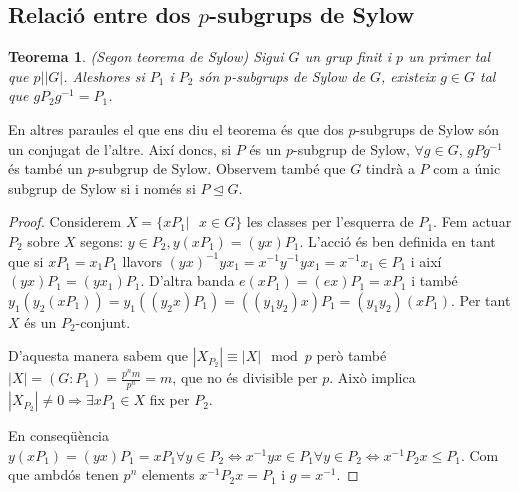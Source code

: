 \documentclass[a4paper,11pt]{report}
\newcommand{\inv}[1]{#1^{-1}}
\newcommand{\ordre}[1]{|#1|}
\theoremstyle{theorem}
\newtheorem{teorema}{\normalfont \sffamily\bfseries Teorema}[section]
\theoremstyle{definition}
\begin{document}
\subsection{Relació entre dos $p$-subgrups de Sylow}
\begin{teorema}{(Segon teorema de Sylow)}
Sigui $G$ un grup finit i $p$ un primer tal que $p\big| |G|$. Aleshores si $P_1$ i $P_2$ són $p$-subgrups de Sylow de $G$, existeix $g\in G$ tal que $gP_2\inv{g}=P_1$. 
\end{teorema}
En altres paraules el que ens diu el teorema és que dos $p$-subgrups de Sylow són un conjugat de l'altre. Així doncs, si $P$ és un $p$-subgrup de Sylow, $\forall g\in G$, $gP\inv{g}$ és també un $p$-subgrup de Sylow. Observem també que $G$ tindrà a $P$ com a únic subgrup de Sylow si i només si $P\unlhd G$.
\begin{proof}
	Considerem $X=\{xP_1|\text{ }x\in G\}$ les classes per l'esquerra de $P_1$. Fem actuar $P_2$ sobre $X$ segons: $y\in P_2, y(xP_1)=(yx)P_1$.
	L'acció és ben definida en tant que si $xP_1=x_1P_1$ llavors $\inv{(yx)}yx_1=\inv{x}\inv{y}yx_1=\inv{x}x_1\in P_1$ i així $(yx)P_1=(yx_1)P_1$. D'altra banda $e(xP_1)=(ex)P_1=xP_1$ i també $y_1(y_2(xP_1))=y_1((y_2x)P_1)=((y_1y_2)x)P_1=(y_1y_2)(xP_1)$. Per tant $X$ és un $P_2$-conjunt.
	
	D'aquesta manera sabem que $\ordre{X_{P_2}}\equiv\ordre{X}\mod p$ però també $\ordre{X}=(G:P_1)=\tfrac{p^nm}{p^n}=m$, que no és divisible per $p$. Això implica $\ordre{X_{P_2}}\neq 0\Rightarrow \exists xP_1\in X$ fix per $P_2$.
	
	En conseqüència $y(xP_1)=(yx)P_1=xP_1\forall y\in P_2\Leftrightarrow \inv{x}yx\in P_1\forall y\in P_2\Leftrightarrow \inv{x}P_2x\leq P_1$. Com que ambdós tenen $p^n$ elements $\inv{x}P_2x= P_1$ i $g=\inv{x}$.
\end{proof}
\end{document}
